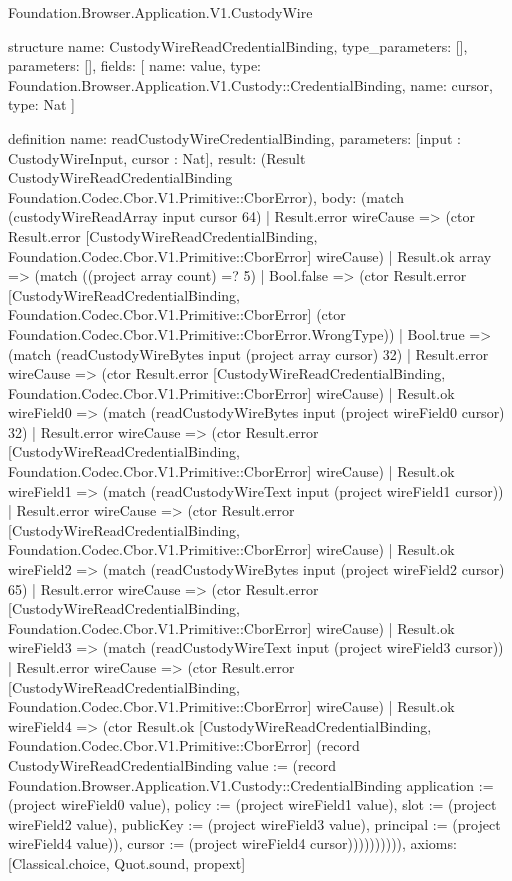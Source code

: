 \begin{lexlean}{Foundation.Browser.Application.V1.CustodyWire}
\begin{semanticmodule}
structure{
  name: CustodyWireReadCredentialBinding,
  type_parameters: [],
  parameters: [],
  fields: [
    {name: value, type: Foundation.Browser.Application.V1.Custody::CredentialBinding},
    {name: cursor, type: Nat}
  ]
}

definition{
  name: readCustodyWireCredentialBinding,
  parameters: [input : CustodyWireInput, cursor : Nat],
  result: (Result CustodyWireReadCredentialBinding Foundation.Codec.Cbor.V1.Primitive::CborError),
  body: (match (custodyWireReadArray input cursor 64)
    | Result.error wireCause => (ctor Result.error [CustodyWireReadCredentialBinding, Foundation.Codec.Cbor.V1.Primitive::CborError] wireCause)
    | Result.ok array => (match ((project array count) =? 5)
      | Bool.false => (ctor Result.error [CustodyWireReadCredentialBinding, Foundation.Codec.Cbor.V1.Primitive::CborError] (ctor Foundation.Codec.Cbor.V1.Primitive::CborError.WrongType))
      | Bool.true => (match (readCustodyWireBytes input (project array cursor) 32)
        | Result.error wireCause => (ctor Result.error [CustodyWireReadCredentialBinding, Foundation.Codec.Cbor.V1.Primitive::CborError] wireCause)
        | Result.ok wireField0 => (match (readCustodyWireBytes input (project wireField0 cursor) 32)
          | Result.error wireCause => (ctor Result.error [CustodyWireReadCredentialBinding, Foundation.Codec.Cbor.V1.Primitive::CborError] wireCause)
          | Result.ok wireField1 => (match (readCustodyWireText input (project wireField1 cursor))
            | Result.error wireCause => (ctor Result.error [CustodyWireReadCredentialBinding, Foundation.Codec.Cbor.V1.Primitive::CborError] wireCause)
            | Result.ok wireField2 => (match (readCustodyWireBytes input (project wireField2 cursor) 65)
              | Result.error wireCause => (ctor Result.error [CustodyWireReadCredentialBinding, Foundation.Codec.Cbor.V1.Primitive::CborError] wireCause)
              | Result.ok wireField3 => (match (readCustodyWireText input (project wireField3 cursor))
                | Result.error wireCause => (ctor Result.error [CustodyWireReadCredentialBinding, Foundation.Codec.Cbor.V1.Primitive::CborError] wireCause)
                | Result.ok wireField4 => (ctor Result.ok [CustodyWireReadCredentialBinding, Foundation.Codec.Cbor.V1.Primitive::CborError] (record CustodyWireReadCredentialBinding {value := (record Foundation.Browser.Application.V1.Custody::CredentialBinding {application := (project wireField0 value), policy := (project wireField1 value), slot := (project wireField2 value), publicKey := (project wireField3 value), principal := (project wireField4 value)}), cursor := (project wireField4 cursor)}))))))))),
  axioms: [Classical.choice, Quot.sound, propext]
}


\end{semanticmodule}
\end{lexlean}
